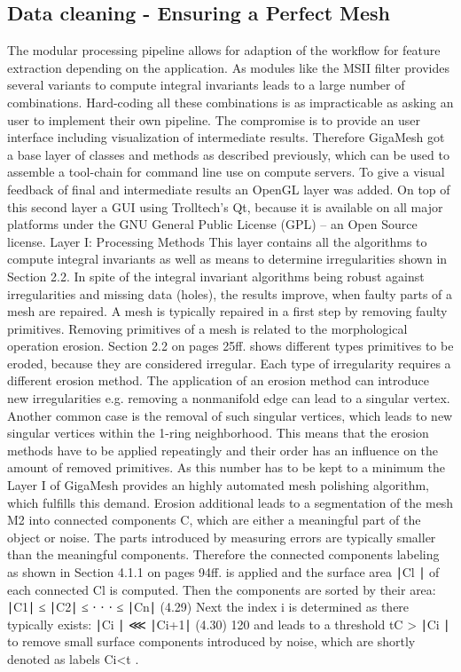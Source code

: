 \documentclass{article}
\begin{document}
\subsection{Data cleaning - Ensuring a Perfect Mesh}
The modular processing pipeline allows for adaption of the workflow for feature extraction depending on the application. As modules like the MSII filter provides several variants to compute integral invariants leads to a large number of combinations. Hard-coding all these combinations is as impracticable as asking an user to implement their own pipeline. The compromise is to provide an user interface including visualization of intermediate results.
Therefore GigaMesh got a base layer of classes and methods as described previously, which can be used to assemble a tool-chain for command line use on compute servers. To give a visual feedback of final and intermediate results an OpenGL layer was added. On top of this second layer a GUI using Trolltech’s Qt, because it is available on all major platforms under the GNU General Public License (GPL) – an Open Source license.
Layer I: Processing Methods
This layer contains all the algorithms to compute integral invariants as well as means to determine irregularities shown in Section 2.2. In spite of the integral invariant algorithms being robust against irregularities and missing data (holes), the results improve, when faulty parts of a mesh are repaired. A mesh is typically repaired in a first step by removing faulty primitives.
Removing primitives of a mesh is related to the morphological operation erosion. Section 2.2 on pages 25ff. shows different types primitives to be eroded, because they are considered irregular. Each type of irregularity requires a different erosion method. The application of an erosion method can introduce new irregularities e.g. removing a nonmanifold edge can lead to a singular vertex. Another common case is the removal of such singular vertices, which leads to new singular vertices within the 1-ring neighborhood. This means that the erosion methods have to be applied repeatingly and their order has an influence on the amount of removed primitives. As this number has to be kept to a minimum the Layer I of GigaMesh provides an highly automated mesh polishing algorithm, which fulfills this demand. Erosion additional leads to a segmentation of the mesh M2 into connected components C, which are either a meaningful part of the object or noise. The parts introduced by measuring errors are typically smaller than the meaningful components.
Therefore the connected components labeling as shown in Section 4.1.1 on pages 94ff. is applied and the surface area ∣Cl ∣ of each connected Cl is computed. Then the components are sorted by their area: ∣C1∣ ≤ ∣C2∣ ≤ ⋅ ⋅ ⋅ ≤ ∣Cn∣ (4.29) Next the index i is determined as there typically exists: ∣Ci ∣ ⋘ ∣Ci+1∣ (4.30) 120 and leads to a threshold tC > ∣Ci ∣ to remove small surface components introduced by noise, which are shortly denoted as labels Ci<t .
\end{document}
